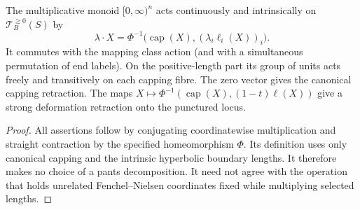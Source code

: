 \begin{corollary}\label{A4-action}
The multiplicative monoid $[0,\infty)^n$ acts continuously and intrinsically on $\mathcal T_B^{\geq0}(S)$ by
\[
\lambda\cdot X=\Phi^{-1}\bigl(\operatorname{cap}(X),(\lambda_i\ell_i(X))_i\bigr).
\]
It commutes with the mapping class action (and with a simultaneous permutation of end labels). On the positive-length part its group of units acts freely and transitively on each capping fibre. The zero vector gives the canonical capping retraction. The maps $X\mapsto\Phi^{-1}(\operatorname{cap}(X),(1-t)\ell(X))$ give a strong deformation retraction onto the punctured locus.
\end{corollary}
\begin{proof}
All assertions follow by conjugating coordinatewise multiplication and straight contraction by the specified homeomorphism $\Phi$. Its definition uses only canonical capping and the intrinsic hyperbolic boundary lengths. It therefore makes no choice of a pants decomposition. It need not agree with the operation that holds unrelated Fenchel--Nielsen coordinates fixed while multiplying selected lengths.
\end{proof}
